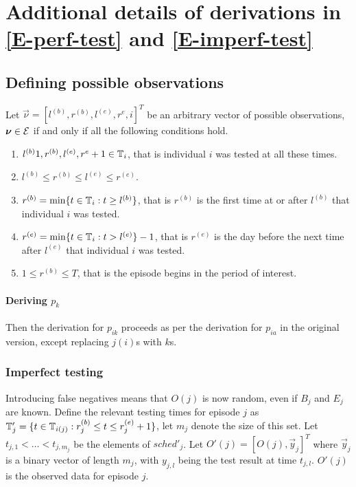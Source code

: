 \documentclass[thesis.tex]{subfiles}
\begin{document}
\chapter{Additional details of derivations in \cref{E-perf-test} and \cref{E-imperf-test}}

\section{Defining possible observations} \label{perf-test:sec:conditions-nu-E}

Let $\vec{\nu} = [l^{(b)}, r^{(b)}, l^{(e)}, r^{e}, i]^T$ be an arbitrary vector of possible observations, $\bm{\nu} \in \mathcal{E}$ if and only if all the following conditions hold.
\begin{enumerate}
  \item $l^{(b)} 1, r^{(b)}, l^{(e)}, r^{e} + 1 \in \mathbb{T}_{i}$, that is individual ${i}$ was tested at all these times.
  \item $l^{(b)} \leq r^{(b)} \leq l^{(e)} \leq r^{(e)}$.
  \item $r^{(b)} = \min\{t \in \mathbb{T}_{i} : t \geq l^{(b)}\}$, that is $r^{(b)}$ is the first time at or after $l^{(b)}$ that individual ${i}$ was tested.
  \item $r^{(e)} = \min\{t \in \mathbb{T}_{i} : t > l^{(e)}\} - 1$, that is $r^{(e)}$ is the day before the next time after $l^{(e)}$ that individual ${i}$ was tested.
  \item $1 \leq r^{(b)} \leq T$, that is the episode begins in the period of interest.
\end{enumerate}


\subsubsection{Deriving $p_k$}


Then the derivation for $p_{ik}$ proceeds as per the derivation for $p_{ia}$ in the original version, except replacing $j(i)$s with $k$s.

\subsection{Imperfect testing}

Introducing false negatives means that $O(j)$ is now random, even if $B_j$ and $E_j$ are known.
Define the relevant testing times for episode $j$ as $\mathbb{T}'_j = \{ t \in \mathbb{T}_{i(j)} : r_j^{(b)} \leq t \leq r_j^{(e)} + 1 \}$, let $m_j$ denote the size of this set.
Let $t_{j,1} < \dots < t_{j,m_j}$ be the elements of $sched'_j$.
Let $O'(j) = [O(j), \vec{y}_j]^T$ where $\vec{y}_j$ is a binary vector of length $m_j$, with $y_{j,l}$ being the test result at time $t_{j,l}$.
$O'(j)$ is the observed data for episode $j$.
\end{document}
